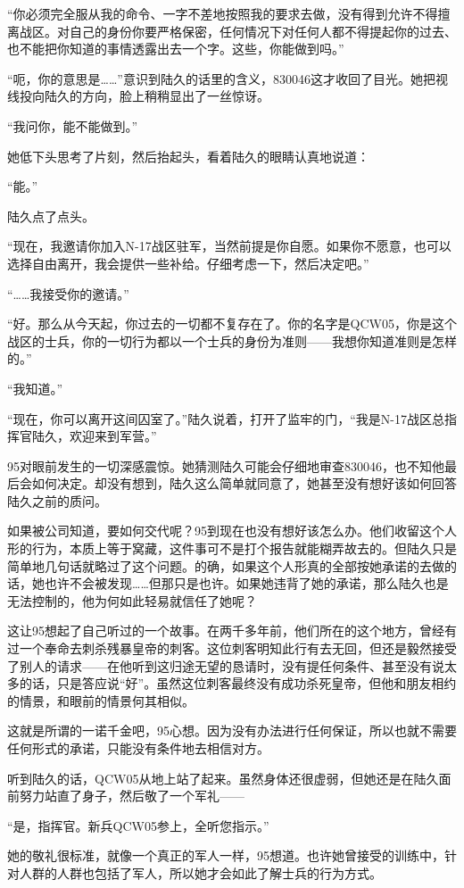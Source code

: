 “你必须完全服从我的命令、一字不差地按照我的要求去做，没有得到允许不得擅离战区。对自己的身份你要严格保密，任何情况下对任何人都不得提起你的过去、也不能把你知道的事情透露出去一个字。这些，你能做到吗。”

“呃，你的意思是……”意识到陆久的话里的含义，830046这才收回了目光。她把视线投向陆久的方向，脸上稍稍显出了一丝惊讶。

“我问你，能不能做到。” 

她低下头思考了片刻，然后抬起头，看着陆久的眼睛认真地说道：

“能。”

陆久点了点头。

“现在，我邀请你加入N-17战区驻军，当然前提是你自愿。如果你不愿意，也可以选择自由离开，我会提供一些补给。仔细考虑一下，然后决定吧。”

“……我接受你的邀请。”

“好。那么从今天起，你过去的一切都不复存在了。你的名字是QCW05，你是这个战区的士兵，你的一切行为都以一个士兵的身份为准则——我想你知道准则是怎样的。”

“我知道。”

“现在，你可以离开这间囚室了。”陆久说着，打开了监牢的门，“我是N-17战区总指挥官陆久，欢迎来到军营。”

95对眼前发生的一切深感震惊。她猜测陆久可能会仔细地审查830046，也不知他最后会如何决定。却没有想到，陆久这么简单就同意了，她甚至没有想好该如何回答陆久之前的质问。

如果被公司知道，要如何交代呢？95到现在也没有想好该怎么办。他们收留这个人形的行为，本质上等于窝藏，这件事可不是打个报告就能糊弄故去的。但陆久只是简单地几句话就略过了这个问题。的确，如果这个人形真的全部按她承诺的去做的话，她也许不会被发现……但那只是也许。如果她违背了她的承诺，那么陆久也是无法控制的，他为何如此轻易就信任了她呢？

这让95想起了自己听过的一个故事。在两千多年前，他们所在的这个地方，曾经有过一个奉命去刺杀残暴皇帝的刺客。这位刺客明知此行有去无回，但还是毅然接受了别人的请求——在他听到这归途无望的恳请时，没有提任何条件、甚至没有说太多的话，只是答应说“好”。虽然这位刺客最终没有成功杀死皇帝，但他和朋友相约的情景，和眼前的情景何其相似。

这就是所谓的一诺千金吧，95心想。因为没有办法进行任何保证，所以也就不需要任何形式的承诺，只能没有条件地去相信对方。

听到陆久的话，QCW05从地上站了起来。虽然身体还很虚弱，但她还是在陆久面前努力站直了身子，然后敬了一个军礼——

“是，指挥官。新兵QCW05参上，全听您指示。”

她的敬礼很标准，就像一个真正的军人一样，95想道。也许她曾接受的训练中，针对人群的人群也包括了军人，所以她才会如此了解士兵的行为方式。

